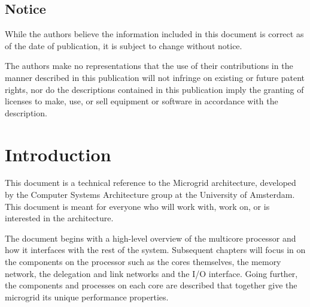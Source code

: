 \section*{Notice}

While the authors believe the information included in this document is
correct as of the date of publication, it is subject to change without
notice.

The authors make no representations that the use of their contributions in
the manner described in this publication will not infringe on existing
or future patent rights, nor do the descriptions contained in this
publication imply the granting of licenses to make, use, or sell
equipment or software in accordance with the description.

\chapter{\label{chapter:intro}Introduction}

This document is a technical reference to the Microgrid architecture, developed by the Computer Systems Architecture group at the University of Amsterdam. This document is meant for everyone who will work with, work on, or is interested in the architecture.

The document begins with a high-level overview of the multicore processor and how it interfaces with the rest of the system. Subsequent chapters will focus in on the components on the processor such as the cores themselves, the memory network, the delegation and link networks and the I/O interface. Going further, the components and processes on each core are described that together give the microgrid its unique performance properties.

